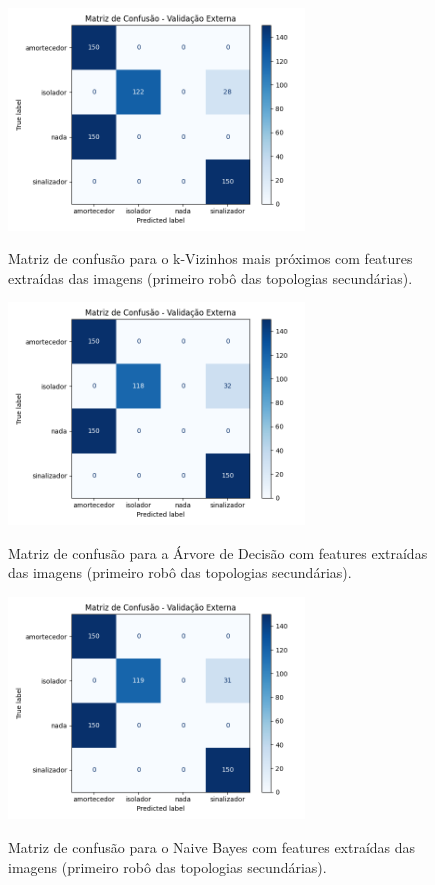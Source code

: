 \begin{figure}[H]
\centering
\caption{Matriz de confusão para o k-Vizinhos mais próximos com features extraídas das imagens (primeiro robô das topologias secundárias).}
\includegraphics[width=0.7\textwidth]{figuras/Resultados/multi_primeiro_Teste3_knn.png}
\label{fig:mc_featimg_knn_robo1_t3}
\fonte{}
\end{figure}

\begin{figure}[H]
\centering
\caption{Matriz de confusão para a Árvore de Decisão com features extraídas das imagens (primeiro robô das topologias secundárias).}
\includegraphics[width=0.7\textwidth]{figuras/Resultados/multi_primeiro_Teste3_tree.png}
\label{fig:mc_featimg_tree_robo1_t3}
\fonte{}
\end{figure}

\begin{figure}[H]
\centering
\caption{Matriz de confusão para o Naive Bayes com features extraídas das imagens (primeiro robô das topologias secundárias).}
\includegraphics[width=0.7\textwidth]{figuras/Resultados/multi_primeiro_Teste3_naive.png}
\label{fig:mc_featimg_naive_robo1_t3}
\fonte{}
\end{figure}

